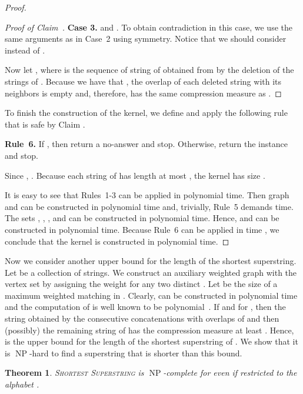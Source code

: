 \documentclass[11pt]{article}
\newtheorem{theorem}{Theorem}
\DeclareMathOperator{\operatorClassNP}{NP}
\newcommand{\classNP}{\ensuremath{\operatorClassNP}}
\begin{document}
\begin{proof}
\begin{proof}[Proof of Claim~]
\medskip
\noindent
{\bf Case 3.}  and . To obtain contradiction in this case, we use the same arguments as in Case~2 using symmetry. Notice that we should consider  instead of .

\medskip
Now  let , where  is the sequence of string of  obtained from  by the deletion of the strings of . Because we have that , the overlap of each deleted string with its neighbors is empty and, therefore,  has the same compression measure as .
\end{proof}

To finish the construction of the kernel, we define  and apply the following rule that is safe by Claim .

\medskip
\noindent
{\bf Rule~6.} If , then return a no-answer and stop. Otherwise, return the instance  and stop. 

\medskip
Since , . Because each string of  has length at most , the kernel has size . 

It is easy to see that  Rules~1-3 can be applied in polynomial time.  Then graph   and  can be constructed in polynomial time and, trivially, Rule~5 demands  time. The sets , , ,  and  can be constructed in polynomial time. Hence,  and  can be constructed in polynomial time. Because Rule~6 can be applied in time , we conclude that the kernel is constructed in polynomial time.
\end{proof}

Now we consider another upper bound for the length of the shortest superstring. Let  be a collection of strings. We construct 
 an auxiliary weighted graph  with the vertex set  by assigning the weight 
for any  two distinct . Let  be the size of a maximum weighted matching in . Clearly,  can be constructed in polynomial time and the computation of  is well known to be polynomial~\cite{Edmonds65}.
If  and  for , then the string  obtained by the consecutive concatenations with overlaps of    and then (possibly) the remaining string of  has the compression measure  at least . Hence,  is the upper bound for the length of the shortest superstring of . We show that it is \classNP-hard to find a superstring that is shorter than this bound.

\begin{theorem}\label{thm:ss_NP_mat}
\textsc{Shortest Superstring} is \classNP-complete for  even if restricted to the alphabet .
\end{theorem} 
\end{document}
